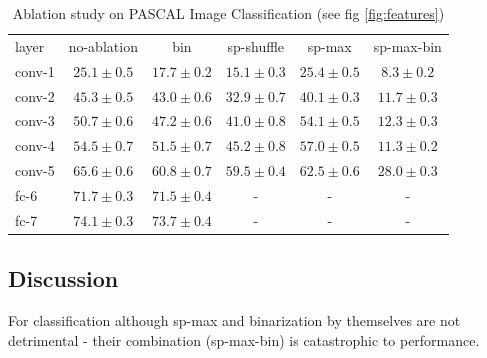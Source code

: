 \setlength{\tabcolsep}{4pt}
\begin{table}[t!]
\begin{center}
\caption{Ablation study on PASCAL Image Classification (see fig \ref{fig:features})}
\label{table:class-ablation}
\begin{tabular}{lccccc}
\hline\noalign{\smallskip}
layer & no-ablation & bin & sp-shuffle & sp-max & sp-max-bin \\
\noalign{\smallskip}
\hline
\noalign{\smallskip}
conv-1 & $25.1 \pm 0.5$ & $17.7 \pm 0.2$ & $15.1 \pm 0.3$ & $25.4 \pm 0.5$ & $8.3  \pm 0.2$  \\ 
conv-2 & $45.3 \pm 0.5$ & $43.0 \pm 0.6$ & $32.9 \pm 0.7$ & $40.1 \pm 0.3$ & $11.7 \pm 0.3$  \\ 
conv-3 & $50.7 \pm 0.6$ & $47.2 \pm 0.6$ & $41.0 \pm 0.8$ & $54.1 \pm 0.5$ & $12.3 \pm 0.3$ \\
conv-4 & $54.5 \pm 0.7$ & $51.5 \pm 0.7$ & $45.2 \pm 0.8$ & $57.0 \pm 0.5$ & $11.3 \pm 0.2$  \\
conv-5 & $65.6 \pm 0.6$ & $60.8 \pm 0.7$ & $59.5 \pm 0.4$ & $62.5 \pm 0.6$ & $28.0 \pm 0.3$ \\
fc-6   & $71.7 \pm 0.3$ & $71.5 \pm 0.4$ &  -             &  -        &  -    \\
fc-7   & $74.1 \pm 0.3$ & $73.7 \pm 0.4$ &  -             &  -        &  -   \\
\hline
\end{tabular}
\end{center}
\end{table}
\setlength{\tabcolsep}{1.4pt}

\setlength{\tabcolsep}{1pt}
\begin{table}[t!]
\begin{center}
\caption{Ablation study on PASCAL Object Detection using conv-5 features\cite{Rcnn}. Binarization leads to negligible drop in performance whereas as \textit{sp-max} causes a large drop in performance.}
\label{table:det-ablation}
\end{center}
\end{table}
\setlength{\tabcolsep}{1.4pt}


\subsection{Discussion}
For classification although sp-max and binarization by themselves are not detrimental - their combination (sp-max-bin) is catastrophic to performance.